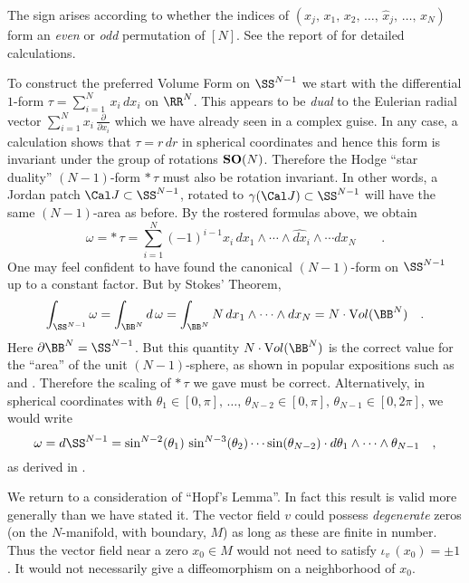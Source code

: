 The sign arises according to whether the indices of $\left(x_j,\, x_1, \,x_2,\,\dotsc,\, \hat{x}_j,\, \dotsc,\, x_N\right)$ form an {\it even} or {\it odd} permutation of $[N]$. See the report of \cite{Dray} for detailed calculations.

To construct the preferred Volume Form on $\SS^{N - 1}$ we start with the differential $1$-form $\tau = \displaystyle{\sum_{i=1}^N}\, x_i \,dx_i$ on $\RR^N$. This appears to be {\it dual} to the Eulerian radial vector $\displaystyle{\sum_{i=1}^N x_i \,\frac{\partial}{\partial x_i}}$ which we have already seen in a complex guise. In any case, a calculation shows that $\tau = r\, dr$ in spherical coordinates and hence this form is invariant under the group of rotations $\bold S \bold O (N)$. Therefore the Hodge ``star duality'' $(N - 1)$-form $*\,\tau$ must also be rotation invariant. In other words, a Jordan patch ${\Cal J}\subset \SS^{N-1}$, rotated to $\gamma({\Cal J}) \subset \SS^{N - 1}$ will have the same $(N - 1)$-area as before. By the rostered formulas above, we obtain
$$\omega = *\,\tau = \sum_{i=1}^N (- 1)^{i - 1} x_i\, dx_1 \wedge \cdots \wedge \hat{dx}_i \wedge \cdots dx_N \qquad .$$
One may feel confident to have found the canonical $(N - 1)$-form on $\SS^{N - 1}$ up to a constant factor. But by Stokes' Theorem,
$$\int_{\SS^{N-1}} \omega = \int_{\BB^N}d\,\omega = \int_{\BB^N} N \,dx_1\wedge \cdots \wedge dx_N = N \cdot {\text Vol}(\BB^N)\quad .$$
Here $\partial \BB^N = \SS^{N - 1}$. But this quantity $N \cdot {\text Vol}(\BB^N)$ is the correct value for the ``area'' of the unit $(N - 1)$-sphere, as shown in popular expositions such as \cite{Folland} and \cite{XWang}. Therefore the scaling of $*\,\tau$ we gave must be correct. Alternatively, in spherical coordinates with $\theta_1 \in [0, \pi], \,\dotsc,\, \theta_{N - 2} \in [0,\pi],\, \theta_{N - 1} \in [0, 2\pi]$, we would write
$$\omega = d\SS^{N - 1} = \sin^{N - 2} (\theta_1)\, \sin^{N - 3}(\theta_2) \cdots \sin (\theta_{N - 2}) \cdot d\theta_1\wedge \cdots \wedge \theta_{N - 1}\quad ,$$
as derived in \cite{Blumenson}.

We return to a consideration of ``Hopf's Lemma''. In fact this result is valid more generally than we have stated it. The vector field $v$ could possess {\it degenerate} zeros (on the $N$-manifold, with boundary, $M$) as long as these are finite in number. Thus the vector field near a zero $x_0 \in M$ would not need to satisfy $\iota_v \,(x_0) = \pm 1$. It would not necessarily give a diffeomorphism on a neighborhood of $x_0$.

